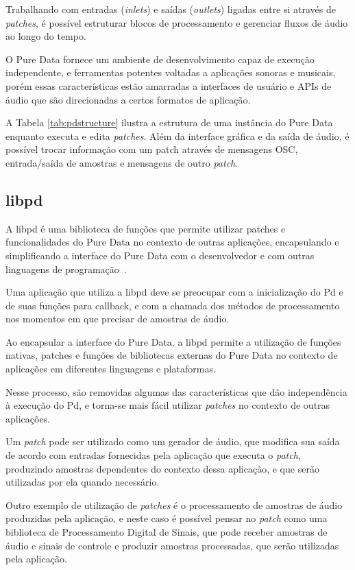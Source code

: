 \documentclass[a4paper, 11pt, twoside]{article}
\begin{document}
\begin{multicols}{2}
Trabalhando com entradas (\textit{inlets}) e saídas (\textit{outlets}) ligadas 
entre si através de \textit{patches}, é possível estruturar blocos de 
processamento e gerenciar fluxos de áudio ao longo do tempo.

O Pure Data fornece um ambiente de desenvolvimento
capaz de execução independente, e ferramentas potentes
voltadas a aplicações sonoras e musicais, porém essas 
características estão amarradas a interfaces de usuário 
e APIs de áudio que são direcionadas a certos formatos de aplicação.

A Tabela \ref{tab:pdstructure} ilustra a estrutura de uma instância do Pure 
Data enquanto executa e edita \textit{patches}. Além da interface
gráfica e da saída de áudio, é possível trocar informação com um patch através
de mensagens OSC, entrada/saída de amostras e mensagens de 
outro \textit{patch}.

\subsection{libpd}

A libpd é uma biblioteca de funções que permite utilizar patches e 
funcionalidades do Pure Data no contexto de outras aplicações,
encapsulando e simplificando a interface do Pure Data com o
desenvolvedor e com outras linguagens de programação~\cite{libpd1}.

Uma aplicação que utiliza a libpd deve se preocupar com a inicialização do Pd
e de suas funções para callback, e com a chamada dos métodos 
de processamento nos momentos em que precisar de amostras de áudio.

Ao encapsular a interface do Pure Data, a libpd
permite a utilização de funções nativas, patches e funções de 
bibliotecas externas do Pure Data no contexto de aplicações em 
diferentes linguagens e plataformas.

Nesse processo, são removidas algumas das características
que dão independência à execução do Pd, e torna-se 
mais fácil utilizar \textit{patches} no contexto de outras aplicações.

Um \textit{patch} pode ser utilizado como um gerador de áudio,
que modifica sua saída de acordo com entradas fornecidas pela
aplicação que executa o \textit{patch}, produzindo amostras 
dependentes do contexto dessa aplicação, e que serão utilizadas 
por ela quando necessário.

Outro exemplo de utilização de \textit{patches} é o processamento de
amostras de áudio produzidas pela aplicação, e neste caso é possível
pensar no \textit{patch} como uma biblioteca de Processamento Digital
de Sinais, que pode receber amostras de áudio e sinais de controle e produzir
amostras processadas, que serão utilizadas pela aplicação.


\end{multicols}
\end{document}

